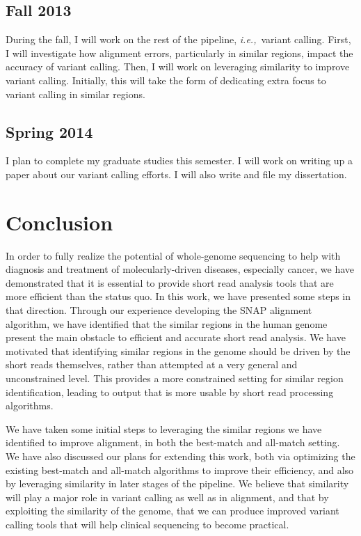 \documentclass[twocolumn,10pt]{article}
\newcommand{\ie}{{\em i.e.,}~}
\begin{document}
\subsection*{Fall 2013}
During the fall, I will work on the rest of the pipeline, \ie variant calling.  First, I will investigate how alignment errors, particularly in similar regions, impact the accuracy of variant calling.  Then, I will work on leveraging similarity to improve variant calling.  Initially, this will take the form of dedicating extra focus to variant calling in similar regions.

\subsection*{Spring 2014}
I plan to complete my graduate studies this semester.  I will work on writing up a paper about our variant calling efforts.  I will also write and file my dissertation.

\section{Conclusion}

In order to fully realize the potential of whole-genome sequencing to help with diagnosis and treatment of molecularly-driven diseases, especially cancer, we have demonstrated that it is essential to provide short read analysis tools that are more efficient than the status quo.  In this work, we have presented some steps in that direction.  Through our experience developing the SNAP alignment algorithm, we have identified that the similar regions in the human genome present the main obstacle to efficient and accurate short read analysis.  We have motivated that identifying similar regions in the genome should be driven by the short reads themselves, rather than attempted at a very general and unconstrained level.  This provides a more constrained setting for similar region identification, leading to output that is more usable by short read processing algorithms.  

We have taken some initial steps to leveraging the similar regions we have identified to improve alignment, in both the best-match and all-match setting.  We have also discussed our plans for extending this work, both via optimizing the existing best-match and all-match algorithms to improve their efficiency, and also by leveraging similarity in later stages of the pipeline.  We believe that similarity will play a major role in variant calling as well as in alignment, and that by exploiting the similarity of the genome, that we can produce improved variant calling tools that will help clinical sequencing to become practical.

\begin{small}

\end{small}
\end{document}
